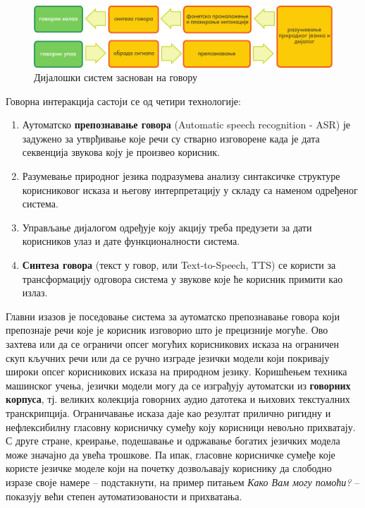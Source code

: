 \begin{multicols}{2}
\begin{figure}[htb]
  \center 
  \includegraphics[width=\textwidth]{../_media/serbian/simple_speech-based_dialogue_architecture}
  \caption{Дијалошки систем заснован на говору}
  \label{fig:dialoguearch_sr}
\end{figure}   


Говорна интеракција састоји се од четири технологије: 
\begin{enumerate}
\item Аутоматско \textbf{препознавање говора} (Automatic speech recognition  - ASR) је задужено за утврђивање које речи су стварно изговорене када је дата секвенција звукова коју је произвео корисник. 
\item Разумевање природног језика подразумева  анализу синтаксичке структуре корисниковог исказа и његову интерпретацију у складу са наменом одређеног система.
\item Управљање дијалогом одређује коју акцију треба предузети за дати корисников улаз и дате функционалности система. 
\item \textbf{Синтеза говора} (текст у говор, или Text-to-Speech, TTS) се користи за трансформацију одговора система у звукове које ће корисник примити као излаз. 
\end{enumerate}
Главни изазов је поседовање система за аутоматско препознавање говора који препознаје речи које је корисник изговорио што је прецизније могуће. Ово захтева или да се ограничи опсег могућих корисникових исказа на ограничен скуп кључних речи или да се ручно изграде језички модели који покривају широки опсег корисникових исказа на природном језику. Коришћењем техника машинског учења, језички модели могу да се изграђују аутоматски из \textbf{говорних корпуса}, тј. великих колекција говорних аудио датотека и њихових текстуалних транскрипција. Ограничавање исказа даје као резултат прилично ригидну и нефлексибилну  гласовну корисничку сумеђу коју корисници невољно прихватају. С друге стране, креирање, подешавање и одржавање богатих језичких модела може значајно да увећа трошкове. Па ипак, гласовне корисничке сумеђе  које користе језичке моделе који на почетку дозвољавају кориснику да слободно изразе своје намере -- подстакнути, на пример питањем \textit{Како Вам могу помоћи?} -- показују већи степен аутоматизованости и прихватања. 


\end{multicols}
